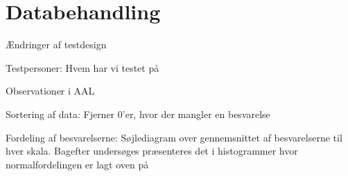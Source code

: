 \chapter{Databehandling}
\label{TestAfSkalaDatabehandling}
%




Ændringer af testdesign

Testpersoner: Hvem har vi testet på 

Observationer i AAL

Sortering af data: Fjerner 0'er, hvor der mangler en besvarelse

Fordeling af besvarelserne: Søjlediagram over gennemsnittet af besvarelserne til hver skala. Bagefter undersøges præsenteres det i histogrammer hvor normalfordelingen er lagt oven på